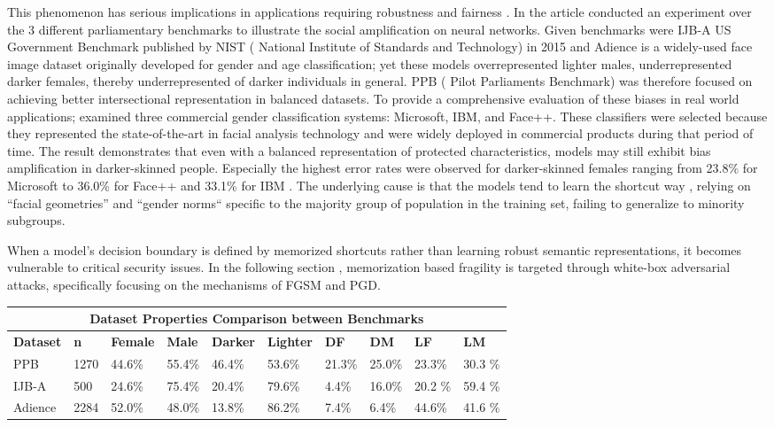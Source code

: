 This phenomenon has serious implications in applications requiring robustness and fairness . In the article \cite{joy_buolamwini_0378cfd5} conducted an experiment over the 3 different parliamentary benchmarks  to illustrate the social amplification on neural networks. Given benchmarks were IJB-A US Government Benchmark published by NIST ( National Institute of Standards and Technology) in 2015 and Adience is a widely-used face image dataset originally developed for gender and age classification; yet these models overrepresented lighter males, underrepresented darker females, thereby underrepresented of darker individuals in general. PPB ( Pilot Parliaments Benchmark) was therefore focused on achieving better intersectional representation  in balanced datasets. To provide a comprehensive evaluation of these biases in real world applications; examined three commercial gender classification systems: Microsoft, IBM, and Face++. These classifiers were selected because they represented the state-of-the-art in facial analysis technology and were widely deployed in commercial products during that period of time. The result demonstrates that even with a balanced representation of protected characteristics, models may still exhibit bias amplification in darker-skinned people. Especially the highest error rates  were observed for darker-skinned females ranging from 23.8\% for Microsoft to 36.0\% for Face++ and 33.1\% for IBM \cite{anoop_krishnan_6fbfbe57}. The underlying cause is that the models tend to learn the shortcut way ,  relying on “facial geometries” and “gender norms“ specific to the majority group of population in the training set, failing to generalize to minority subgroups.

When a model’s decision boundary is defined by memorized shortcuts rather than learning robust semantic representations, it becomes vulnerable to critical security issues. In the following section , memorization based fragility is targeted through white-box adversarial attacks, specifically focusing on the mechanisms of FGSM and PGD.
\begin{table}
    \centering
    \begin{tabularx}{\textwidth}{|X|X|X|X|X|X|X|X|X|X|}
    \toprule
    \multicolumn{10}{|c|}{\textbf{Dataset Properties Comparison between Benchmarks}} \\
    \midrule{}
    \textbf{Dataset} & \textbf{n} & \textbf{Female} & \textbf{Male} & \textbf{Darker} & \textbf{Lighter} & \textbf{DF} & \textbf{DM} & \textbf{LF} & \textbf{LM} \\
    \midrule{}
 PPB   & 1270  & 44.6\% & 55.4\% & 46.4\% &53.6\% & 21.3\% & 25.0\% & 23.3\% & 30.3 \%\\
 IJB-A & 500  & 24.6\% & 75.4\% & 20.4\% & 79.6\% & 4.4\% & 16.0\% & 20.2 \% & 59.4 \%\\
 Adience & 2284 & 52.0\% & 48.0\% & 13.8\% & 86.2\% & 7.4\% & 6.4\% & 44.6\% & 41.6 \% \\

 \bottomrule
\end{tabularx}



\end{table}
